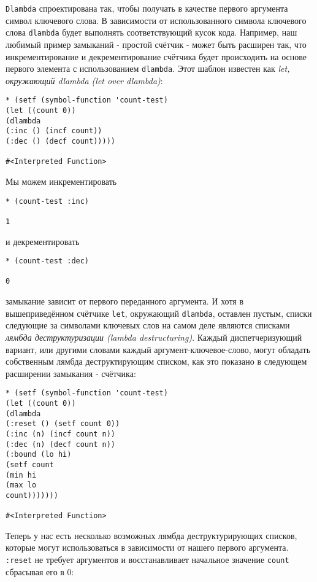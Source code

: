 \verb"Dlambda" спроектирована так, чтобы получать в качестве первого аргумента символ ключевого слова. В зависимости от использованного символа ключевого слова \verb"dlambda" будет выполнять соответствующий кусок кода. Например, наш любимый пример замыканий - простой счётчик - может быть расширен так, что инкрементирование и декрементирование счётчика будет происходить на основе первого элемента с использованием \verb"dlambda". Этот шаблон известен как \emph{let, окружающий dlambda (let over dlambda)}:

\begin{verbatim}
* (setf (symbol-function 'count-test)
(let ((count 0))
(dlambda
(:inc () (incf count))
(:dec () (decf count)))))

#<Interpreted Function>
\end{verbatim}

Мы можем инкрементировать

\begin{verbatim}
* (count-test :inc)

1
\end{verbatim}

и декрементировать

\begin{verbatim}
* (count-test :dec)

0
\end{verbatim}

замыкание зависит от первого переданного аргумента. И хотя в вышеприведённом счётчике \verb"let", окружающий \verb"dlambda", оставлен пустым, списки следующие за символами ключевых слов на самом деле являются списками \emph{лямбда деструктуризации (lambda destructuring)}. Каждый диспетчеризующий вариант, или другими словами каждый аргумент-ключевое-слово, могут обладать собственным лямбда деструктирующим списком, как это показано в следующем расширении замыкания - счётчика:

\begin{verbatim}
* (setf (symbol-function 'count-test)
(let ((count 0))
(dlambda
(:reset () (setf count 0))
(:inc (n) (incf count n))
(:dec (n) (decf count n))
(:bound (lo hi)
(setf count
(min hi
(max lo
count)))))))

#<Interpreted Function>
\end{verbatim}

Теперь у нас есть несколько возможных лямбда деструктурирующих списков, которые могут использоваться в зависимости от нашего первого аргумента. \verb":reset" не требует аргументов и восстанавливает начальное значение \verb"count" сбрасывая его в 0:

